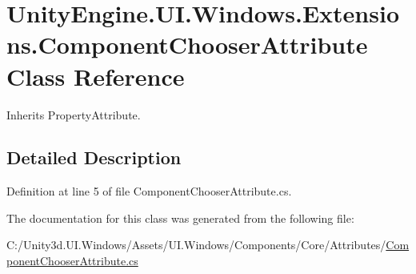 \hypertarget{class_unity_engine_1_1_u_i_1_1_windows_1_1_extensions_1_1_component_chooser_attribute}{}\section{Unity\+Engine.\+U\+I.\+Windows.\+Extensions.\+Component\+Chooser\+Attribute Class Reference}
\label{class_unity_engine_1_1_u_i_1_1_windows_1_1_extensions_1_1_component_chooser_attribute}


Inherits Property\+Attribute.



\subsection{Detailed Description}


Definition at line 5 of file Component\+Chooser\+Attribute.\+cs.



The documentation for this class was generated from the following file\+:\begin{DoxyCompactItemize}
\item 
C\+:/\+Unity3d.\+U\+I.\+Windows/\+Assets/\+U\+I.\+Windows/\+Components/\+Core/\+Attributes/\hyperlink{_component_chooser_attribute_8cs}{Component\+Chooser\+Attribute.\+cs}\end{DoxyCompactItemize}
